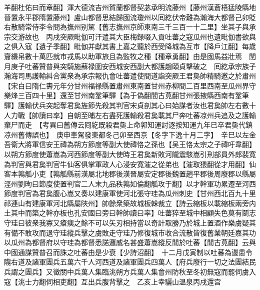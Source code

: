 羊翻杜佑曰而章翻】渾大德流吉州賀蘭都督契苾承明流藤州【藤州漢蒼梧猛陵縣地晉置永平郡隋置藤州】盧山都督思結歸國流瓊州以囘紇伏帝難為瀚海大都督己卯貶右散騎常侍李令問為撫州别駕【舊志撫州京師東南三千三百一十二里】坐其子與承宗交游故也　丙戌突厥毗伽可汗遣其大臣梅録啜入貢吐蕃之寇瓜州也遺毗伽書欲與之俱入寇【遺子季翻】毗伽并獻其書上嘉之聽於西受降城為互市【降戶江翻】每歲齎縑帛數十萬匹就市戎馬以助軍旅且為監牧之種【種章勇翻】由是國馬益壯焉　閏月庚子吐蕃贊普與突騎施蘇禄圍安西城安西副大都護趙頤貞擊破之　囘紇承宗族子瀚海司馬護輸糾合黨衆為承宗報仇會吐蕃遣使間道詣突厥王君㚟帥精騎邀之於肅州【宋白曰隋仁夀元年分甘州福禄縣置肅州東南置甘州赤柳間二百里西南至瓜州界守樂烽三百四十里】還至甘州南鞏筆驛【為于偽翻間古莧翻甘州張掖縣西南有鞏筆驛】護輸伏兵突起奪君㚟旌節先殺其判官宋貞剖其心曰始謀者汝也君㚟帥左右數十人力戰【帥讀曰率】自朝至晡左右盡死護輸殺君㚟載其尸奔吐蕃凉州兵追及之護輸棄尸而走　【考異曰舊傳云囘紇既殺君㚟上命郭知運討逐按知運九年已卒君㚟代鎮凉州舊傳誤也】　庚申車駕發東都冬己卯至西京【冬字下逸十月二字】　辛巳以左金吾衛大將軍信安王禕為朔方節度等副大使禕恪之孫也【吴王恪太宗之子禕吁韋翻】以朔方節度使蕭嵩為河西節度等副大使時王君㚟新敗河隴震駭嵩引刑部員外郎裴寛為判官與君㚟判官牛仙客俱掌軍政人心浸安寛漼之從弟也【漼取猥翻從才用翻】仙客本鶉觚小吏【鶉觚縣前漢屬北地郡後漢晉屬安定郡後魏置趙平郡後周廢郡以縣屬涇州劉昫曰節度使置判官二人末九品秩鶉如倫翻觚攻于翻】以才幹軍功累遷至河西節度判官為君㚟腹心嵩又奏以建康軍使河北張守珪為瓜州刺史【甘州西北百九十里祁連山有建康軍河北縣屬陜州】帥餘衆築故城板榦裁立【詩云縮板以載縮板兩旁内土其中而築之幹亦板也孔安國曰旁曰幹帥讀曰率】吐蕃猝至城中相顧失色莫有鬬志守珪曰彼衆我寡又瘡痍之餘不可以矢刃相持當以奇計取勝乃於城上置酒作樂虜疑其有備不敢攻而退守珪縱兵擊之虜敗走守珪乃修復城市收合流散皆復舊業朝廷嘉其功以瓜州為都督府以守珪為都督悉諾邏威名甚盛蕭嵩縱反閒於吐蕃【閒古莧翻】云與中國通謀贊普召而誅之吐蕃由是少衰【少詩沼翻】　十二月戊寅制以吐蕃為邊患令隴右道及諸軍團兵五萬六千人河西道及諸軍團兵四萬人【府兵廢行一切之法團結民兵謂之團兵】又徵關中兵萬人集臨洮朔方兵萬人集會州防秋至冬初無寇而罷伺虜入寇【洮士力翻伺相吏翻】互出兵腹背擊之　乙亥上幸驪山温泉丙戌還宫

